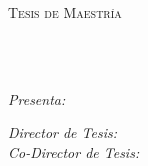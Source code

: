 \documentclass[
10pt, %
spanish, %
onehalfspacing,%
headsepline, %
]{MastersDoctoralThesis} %
\author{Joel \textsc{Chacón Castillo}} %
\begin{document}
\frontmatter %

\pagestyle{plain} %


\begin{titlepage}
\begin{center}
{\scshape\LARGE \univname\par}\vspace{1.5cm} %
\textsc{\Large Tesis de Maestr\'ia}\\[0.5cm] %
\HRule \\[0.4cm] %
{\huge \bfseries \ttitle\par}\vspace{0.4cm} %
\HRule \\[1.5cm] %
 
\begin{minipage}[t]{0.4\textwidth}
\begin{flushleft} \large
\emph{Presenta:}\\
\href{http://www.johnsmith.com}{\authorname} %
\end{flushleft}
\end{minipage}
\begin{minipage}[t]{0.4\textwidth}
\begin{flushright} \large
\emph{Director de Tesis:} \\
\href{http://www.jamessmith.com}{\supname} %
\emph{Co-Director de Tesis:} \\
\href{http://www.jamessmith.com}{\cosupname} %

\end{flushright}
\end{minipage}\\[3cm]



\end{center}
\end{titlepage}
\end{document}
